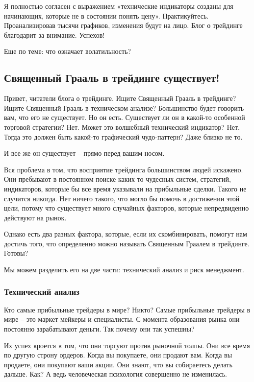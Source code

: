 \documentclass[a5paper]{article}
\begin{document}
Я полностью согласен с выражением «технические индикаторы созданы для начинающих, которые не в состоянии понять цену». Практикуйтесь. Проанализировав тысячи графиков, изменения будут на лицо. Блог о трейдинге благодарит за внимание. Успехов!

Еще по теме: что означает волатильность?

\subsection{Священный Грааль в трейдинге существует!}

Привет, читатели блога о трейдинге. Ищите Священный Грааль в трейдинге? Ищите Священный Грааль в техническом анализе? Большинство будет говорить вам, что его не существует. Но он есть. Существует ли он в какой-то особенной торговой стратегии? Нет. Может это волшебный технический индикатор? Нет. Тогда это должен быть какой-то графический чудо-паттерн? Даже близко не то.

И все же он существует – прямо перед вашим носом.

Вся проблема в том, что восприятие трейдинга большинством людей искажено. Они пребывают в постоянном поиске каких-то чудесных систем, стратегий, индикаторов, которые бы все время указывали на прибыльные сделки. Такого не случится никогда. Нет ничего такого, что могло бы помочь в достижении этой цели, потому что существует много случайных факторов, которые непредвиденно действуют на рынок.

Однако есть два разных фактора, которые, если их скомбинировать, помогут нам достичь того, что определенно можно называть Священным Граалем в трейдинге. Готовы?

Мы можем разделить его на две части: технический анализ и риск
менеджмент.

\subsubsection{Технический анализ}

Кто самые прибыльные трейдеры в мире? Никто? Самые прибыльные трейдеры в мире – это маркет мейкеры и специалисты. С момента образования рынка они постоянно зарабатывают деньги. Так почему они так успешны?

Их успех кроется в том, что они торгуют против рыночной толпы. Они все время по другую строну ордеров. Когда вы покупаете, они продают вам. Когда вы продаете, они покупают ваши акции. Они знают, что вы собираетесь делать дальше. Как? А ведь человеческая психология совершенно не изменилась.
\end{document}
